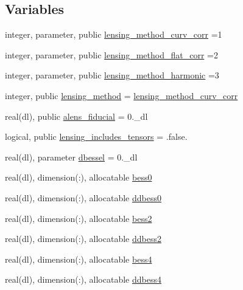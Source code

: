\subsection*{Variables}
\begin{DoxyCompactItemize}
\item 
integer, parameter, public \mbox{\hyperlink{namespacelensing_a7f44051d5173429e3e2261d44e4b47f8}{lensing\+\_\+method\+\_\+curv\+\_\+corr}} =1
\item 
integer, parameter, public \mbox{\hyperlink{namespacelensing_a8104e288b73af5ec7004643639d08798}{lensing\+\_\+method\+\_\+flat\+\_\+corr}} =2
\item 
integer, parameter, public \mbox{\hyperlink{namespacelensing_a0af93cd038a1a553e2edc7e49c39f4d9}{lensing\+\_\+method\+\_\+harmonic}} =3
\item 
integer, public \mbox{\hyperlink{namespacelensing_a3710bc1b92b6fd87d6e8c1256f0a46bb}{lensing\+\_\+method}} = \mbox{\hyperlink{namespacelensing_a7f44051d5173429e3e2261d44e4b47f8}{lensing\+\_\+method\+\_\+curv\+\_\+corr}}
\item 
real(dl), public \mbox{\hyperlink{namespacelensing_a3a5d51bfc096d14582dbf48fc094ffee}{alens\+\_\+fiducial}} = 0.\+\_\+dl
\item 
logical, public \mbox{\hyperlink{namespacelensing_acdb3e1d4390cc8b027cd17aeb1669c93}{lensing\+\_\+includes\+\_\+tensors}} = .false.
\item 
real(dl), parameter \mbox{\hyperlink{namespacelensing_a4f43eba14b18981f0f0bff9a117122fe}{dbessel}} = 0.\+\_\+dl
\item 
real(dl), dimension(\+:), allocatable \mbox{\hyperlink{namespacelensing_aedcd5bd61cd6f457b30a9197a6a8c49c}{bess0}}
\item 
real(dl), dimension(\+:), allocatable \mbox{\hyperlink{namespacelensing_aaa35de68ce5b9c6b986ebdf536468c80}{ddbess0}}
\item 
real(dl), dimension(\+:), allocatable \mbox{\hyperlink{namespacelensing_a2d7ff26f68bd68d466d651f07fd262fd}{bess2}}
\item 
real(dl), dimension(\+:), allocatable \mbox{\hyperlink{namespacelensing_a18c643c5ab84df5ac5f56ee6d426ffa7}{ddbess2}}
\item 
real(dl), dimension(\+:), allocatable \mbox{\hyperlink{namespacelensing_a835b869aac1268a3e5f6dea95667740b}{bess4}}
\item 
real(dl), dimension(\+:), allocatable \mbox{\hyperlink{namespacelensing_a1f5bffd45d988c4c941031621cd0c266}{ddbess4}}
\item 

\end{DoxyCompactItemize}
